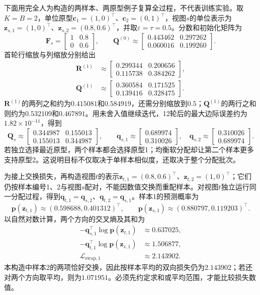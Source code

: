 下面用完全人为构造的两样本、两原型例子复算全过程，不代表训练实验。取$K=B=2$，单位原型$\bm{c}_1=(1,0)^{\top}$、$\bm{c}_2=(0,1)^{\top}$，视图$s$的单位表示为$\bm{z}_{s,1}=(1,0)^{\top}$、$\bm{z}_{s,2}=(0.8,0.6)^{\top}$，并取$\varepsilon=\tau=0.5$。分数和初始化矩阵为
\[
  \bm{F}_s=\begin{bmatrix}1&0.8\\0&0.6\end{bmatrix},
  \qquad
  \bm{Q}^{(0)}\approx
  \begin{bmatrix}0.443462&0.297262\\0.060016&0.199260\end{bmatrix}.
\]
首轮行缩放与列缩放分别给出
\[
  \begin{aligned}
    \bm{R}^{(1)}&\approx
    \begin{bmatrix}0.299344&0.200656\\0.115738&0.384262\end{bmatrix},\\
    \bm{Q}^{(1)}&\approx
    \begin{bmatrix}0.360584&0.171525\\0.139416&0.328475\end{bmatrix}.
  \end{aligned}
\]
$\bm{R}^{(1)}$的两列之和约为$0.415081$和$0.584919$，还需分别缩放到$0.5$；$\bm{Q}^{(1)}$的两行之和则约为$0.532109$和$0.467891$。用未舍入值继续迭代，12轮后的最大边际误差约为$1.82\times10^{-11}$，得到
\[
  \bm{Q}_s\approx
  \begin{bmatrix}0.344987&0.155013\\0.155013&0.344987\end{bmatrix},
  \qquad
  \bm{q}_{s,1}\approx\begin{bmatrix}0.689974\\0.310026\end{bmatrix},
  \quad
  \bm{q}_{s,2}\approx\begin{bmatrix}0.310026\\0.689974\end{bmatrix}.
\]
若独立选择最近原型，两个样本都会选择原型1；均衡软分配却让第二个样本更多支持原型2。这说明目标不仅取决于单样本相似度，还取决于整个分配批次。

为接上交换损失，再构造视图$t$的表示$\bm{z}_{t,1}=(0.8,0.6)^{\top}$、$\bm{z}_{t,2}=(1,0)^{\top}$；它们仍按样本编号1、2与视图$s$配对，不能因数值交换而重配样本。对视图$t$独立运行同一分配过程，得到$\bm{q}_{t,1}=\bm{q}_{s,2}$、$\bm{q}_{t,2}=\bm{q}_{s,1}$。样本1的预测概率为
\[
  \bm{p}(\bm{z}_{t,1})\approx(0.598688,0.401312)^{\top},
  \qquad
  \bm{p}(\bm{z}_{s,1})\approx(0.880797,0.119203)^{\top}.
\]
以自然对数计算，两个方向的交叉熵及其和为
\[
  \begin{aligned}
    -\bm{q}_{s,1}^{\top}\log\bm{p}(\bm{z}_{t,1})&\approx0.637025,\\
    -\bm{q}_{t,1}^{\top}\log\bm{p}(\bm{z}_{s,1})&\approx1.506877,\\
    \mathcal{L}_{\mathrm{swap},1}&\approx2.143902.
  \end{aligned}
\]
本构造中样本2的两项恰好交换，因此按样本平均的双向损失仍为$2.143902$；若还对两个方向取平均，则为$1.071951$。必须先约定求和或平均范围，才能比较损失数值。

